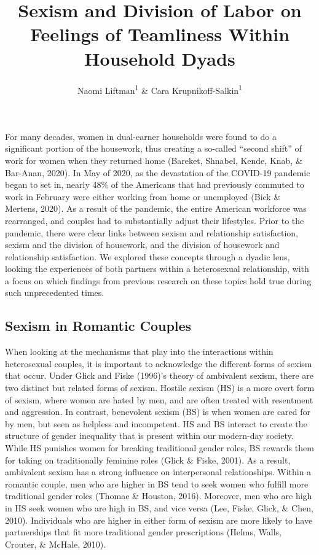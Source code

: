 \documentclass[
  man]{apa6}
\title{Sexism and Division of Labor on Feelings of Teamliness Within Household Dyads}
\author{Naomi Liftman\textsuperscript{1} \& Cara Krupnikoff-Salkin\textsuperscript{1}}
\date{}
\affiliation{\vspace{0.5cm}\textsuperscript{1} Smith College}
\begin{document}
\maketitle

For many decades, women in dual-earner households were found to do a significant portion of the housework, thus creating a so-called ``second shift'' of work for women when they returned home (Bareket, Shnabel, Kende, Knab, \& Bar-Anan, 2020). In May of 2020, as the devastation of the COVID-19 pandemic began to set in, nearly 48\% of the Americans that had previously commuted to work in February were either working from home or unemployed (Bick \& Mertens, 2020). As a result of the pandemic, the entire American workforce was rearranged, and couples had to substantially adjust their lifestyles. Prior to the pandemic, there were clear links between sexism and relationship satisfaction, sexism and the division of housework, and the division of housework and relationship satisfaction. We explored these concepts through a dyadic lens, looking the experiences of both partners within a heterosexual relationship, with a focus on which findings from previous research on these topics hold true during such unprecedented times.

\hypertarget{sexism-in-romantic-couples}{%
\subsection{Sexism in Romantic Couples}\label{sexism-in-romantic-couples}}

When looking at the mechanisms that play into the interactions within heterosexual couples, it is important to acknowledge the different forms of sexism that occur. Under Glick and Fiske (1996)'s theory of ambivalent sexism, there are two distinct but related forms of sexism. Hostile sexism (HS) is a more overt form of sexism, where women are hated by men, and are often treated with resentment and aggression. In contrast, benevolent sexism (BS) is when women are cared for by men, but seen as helpless and incompetent. HS and BS interact to create the structure of gender inequality that is present within our modern-day society. While HS punishes women for breaking traditional gender roles, BS rewards them for taking on traditionally feminine roles (Glick \& Fiske, 2001). As a result, ambivalent sexism has a strong influence on interpersonal relationships. Within a romantic couple, men who are higher in BS tend to seek women who fulfill more traditional gender roles (Thomae \& Houston, 2016). Moreover, men who are high in HS seek women who are high in BS, and vice versa (Lee, Fiske, Glick, \& Chen, 2010). Individuals who are higher in either form of sexism are more likely to have partnerships that fit more traditional gender prescriptions (Helms, Walls, Crouter, \& McHale, 2010).
\end{document}
